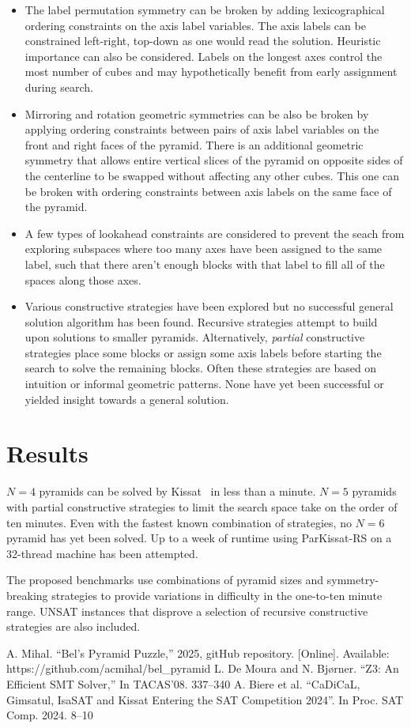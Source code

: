 \documentclass[conference]{IEEEtran}
\begin{document}
\begin{itemize}
\item The label permutation symmetry can be broken by adding lexicographical ordering constraints on the axis label variables.
The axis labels can be constrained left-right, top-down as one would read the solution.
Heuristic importance can also be considered.
Labels on the longest axes control the most number of cubes and may hypothetically benefit from early assignment during search.
\item Mirroring and rotation geometric symmetries can be also be broken by applying ordering constraints between pairs of axis label
variables on the front and right faces of the pyramid.
There is an additional geometric symmetry that allows entire vertical slices of the pyramid on opposite sides of the centerline to be
swapped without affecting any other cubes.
This one can be broken with ordering constraints between axis labels on the same face of the pyramid.
\item A few types of lookahead constraints are considered to prevent the seach from exploring subspaces where too many axes have been
assigned to the same label, such that there aren't enough blocks with that label to fill all of the spaces along those axes.
\item Various constructive strategies have been explored but no successful general solution algorithm has been found.
Recursive strategies attempt to build upon solutions to smaller pyramids.
Alternatively, \emph{partial} constructive strategies place some blocks or assign some axis labels before starting the search to solve the remaining blocks.
Often these strategies are based on intuition or informal geometric patterns. None have yet been successful or yielded insight towards a general solution.
\end{itemize}

\section{Results}

$N=4$ pyramids can be solved by Kissat~\cite{k1} in less than a minute.
$N=5$ pyramids with partial constructive strategies to limit the search space take on the order of ten minutes.
Even with the fastest known combination of strategies, no $N=6$ pyramid has yet been solved.
Up to a week of runtime using ParKissat-RS on a 32-thread machine has been attempted.

The proposed benchmarks use combinations of pyramid sizes and symmetry-breaking strategies to provide variations in difficulty in the one-to-ten minute range.
UNSAT instances that disprove a selection of recursive constructive strategies are also included.

\begin{thebibliography}{0}
 A. Mihal. ``Bel's Pyramid Puzzle,'' 2025, gitHub repository. [Online]. Available: https://github.com/acmihal/bel\_pyramid
 L. De Moura and N. Bj{\o}rner. ``Z3: An Efficient SMT Solver,'' In TACAS'08. 337--340
 A. Biere et al. ``CaDiCaL, Gimsatul, IsaSAT and Kissat Entering the SAT Competition 2024''. In Proc. SAT Comp. 2024. 8--10
\end{thebibliography}
\end{document}
